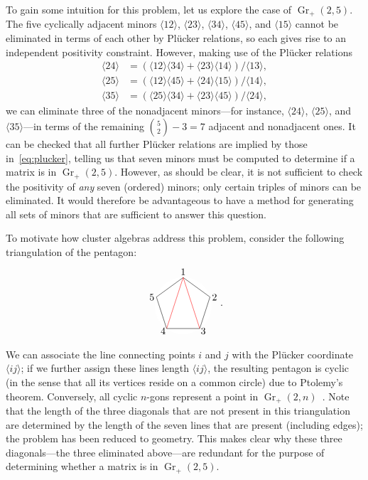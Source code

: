 \documentclass[12pt]{article}
\DeclareMathOperator{\Gr}{Gr}
\def\ket#1{\langle #1 \rangle}
\def\drawLabeledPentagon{
\coordinate (P1) at (90:1);
\coordinate (P2) at (18:1);
\coordinate (P3) at (306:1);
\coordinate (P4) at (234:1);
\coordinate (P5) at (162:1);
\draw[white,fill=white] (0,0) circle (1cm);
\draw (P1) -- (P2) -- (P3) -- (P4) -- (P5) -- cycle;
\draw (0,1.2) node {1};
\draw (.9,.3) node[anchor=west] {2};
\draw (.5,-.9) node[anchor=west] {3};
\draw (-.5,-.9) node[anchor=east] {4};
\draw (-.9,.3) node[anchor=east] {5};
}
\begin{document}
To gain some intuition for this problem, let us explore the case of $\Gr_+(2,5)$. The five cyclically adjacent minors $\ket{12}$, $\ket{23}$, $\ket{34}$, $\ket{45}$, and $\ket{15}$ cannot be eliminated in terms of each other by Pl\"ucker relations, so each gives rise to an independent positivity constraint. However, making use of the Pl\"ucker relations 
\begin{equation} \label{eq:plucker}
\begin{split}
	\ket{24} &= (\ket{12}\ket{34} + \ket{23}\ket{14})/\ket{13},\\
	\ket{25} &= (\ket{12}\ket{45} + \ket{24}\ket{15})/\ket{14},\\
	\ket{35} &= (\ket{25}\ket{34} + \ket{23}\ket{45})/\ket{24},
\end{split}	 	
\end{equation} 
we can eliminate three of the nonadjacent minors---for instance, $\ket{24}$, $\ket{25}$, and $\ket{35}$---in terms of the remaining ${{5}\choose{2}} - 3 = 7$ adjacent and nonadjacent ones. It can be checked that all further Pl\"ucker relations are implied by those in~\eqref{eq:plucker}, telling us that seven minors must be computed to determine if a matrix is in $\Gr_+(2,5)$. However, as should be clear, it is not sufficient to check the positivity of {\it any} seven (ordered) minors; only certain triples of minors can be eliminated. It would therefore be advantageous to have a method for generating all sets of minors that are sufficient to answer this question.

To motivate how cluster algebras address this problem, consider the following triangulation of the pentagon:
\begin{equation} \label{eq:pent_triangulation}
\begin{gathered}
\begin{tikzpicture}
  \drawLabeledPentagon
  \draw[color=red] (P1) -- (P3);
  \draw[color=red] (P1) -- (P4);
\end{tikzpicture} 
\end{gathered} .
\end{equation}
We can associate the line connecting points $i$ and $j$ with the Pl\"ucker coordinate $\ket{ij}$; if we further assign these lines length $\ket{ij}$, the resulting pentagon is cyclic (in the sense that all its vertices reside on a common circle) due to Ptolemy's theorem. Conversely, all cyclic $n$-gons represent a point in $\Gr_+(2,n)$~\cite{Arkani-Hamed:2014bca}. Note that the length of the three diagonals that are not present in this triangulation are determined by the length of the seven lines that are present (including edges); the problem has been reduced to geometry. This makes clear why these three diagonals---the three eliminated above---are redundant for the purpose of determining whether a matrix is in $\Gr_+(2,5)$. 
\end{document}
